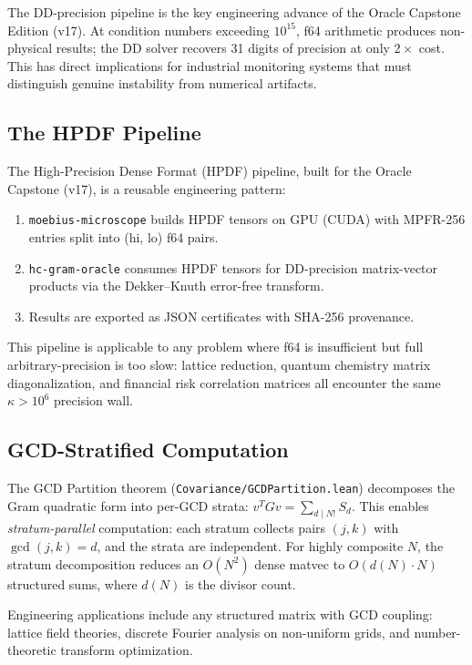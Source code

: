 \documentclass[11pt,a4paper]{article}
\begin{document}
The DD-precision pipeline is the key engineering advance of
the Oracle Capstone Edition (v17). At condition numbers exceeding
$10^{15}$, f64 arithmetic produces non-physical results; the
DD solver recovers 31 digits of precision at only $2\times$ cost.
This has direct implications for industrial monitoring systems
that must distinguish genuine instability from numerical artifacts.

\subsection{The HPDF Pipeline}

The High-Precision Dense Format (HPDF) pipeline, built for the Oracle
Capstone (v17), is a reusable engineering pattern:
\begin{enumerate}
  \item \texttt{moebius-microscope} builds HPDF tensors on GPU (CUDA)
    with MPFR-256 entries split into (hi, lo) f64 pairs.
  \item \texttt{hc-gram-oracle} consumes HPDF tensors for DD-precision
    matrix-vector products via the Dekker--Knuth error-free transform.
  \item Results are exported as JSON certificates with SHA-256 provenance.
\end{enumerate}

This pipeline is applicable to any problem where f64 is insufficient
but full arbitrary-precision is too slow: lattice reduction, quantum
chemistry matrix diagonalization, and financial risk correlation
matrices all encounter the same $\kappa > 10^6$ precision wall.

\subsection{GCD-Stratified Computation}

The GCD Partition theorem (\texttt{Covariance/GCDPartition.lean})
decomposes the Gram quadratic form into per-GCD strata:
$v^T G v = \sum_{d \mid N!} S_d$.
This enables \emph{stratum-parallel} computation: each stratum
collects pairs $(j,k)$ with $\gcd(j,k) = d$, and the strata are
independent. For highly composite $N$, the stratum decomposition
reduces an $O(N^2)$ dense matvec to $O(d(N) \cdot N)$ structured
sums, where $d(N)$ is the divisor count.

Engineering applications include any structured matrix with
GCD coupling: lattice field theories, discrete Fourier analysis
on non-uniform grids, and number-theoretic transform optimization.
\end{document}
